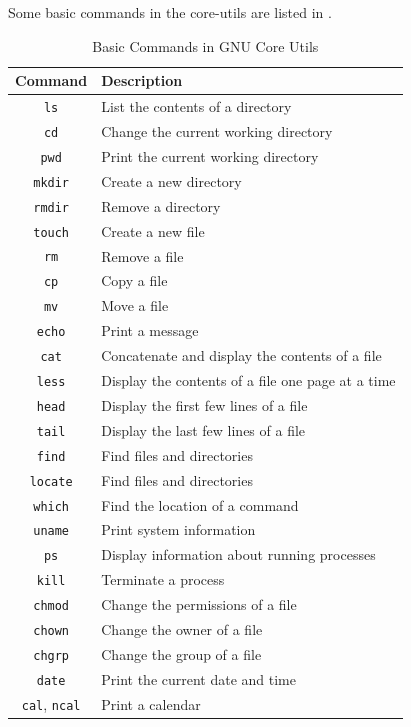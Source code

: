 Some basic commands in the core-utils are listed in .

\begin{table}[h!]
\caption{Basic Commands in GNU Core Utils}
\begin{tabular}{ c l }
  \toprule
 Command & Description \\
 \midrule
  \texttt{ls} & List the contents of a directory \\
  \texttt{cd} & Change the current working directory \\
  \texttt{pwd} & Print the current working directory \\
  \texttt{mkdir} & Create a new directory \\
  \texttt{rmdir} & Remove a directory \\
  \texttt{touch} & Create a new file \\
  \texttt{rm} & Remove a file \\
  \texttt{cp} & Copy a file \\
  \texttt{mv} & Move a file \\
  \texttt{echo} & Print a message \\
  \texttt{cat} & Concatenate and display the contents of a file \\
  \texttt{less} & Display the contents of a file one page at a time \\
  \texttt{head} & Display the first few lines of a file \\
  \texttt{tail} & Display the last few lines of a file \\
  \texttt{find} & Find files and directories \\
  \texttt{locate} & Find files and directories \\
  \texttt{which} & Find the location of a command \\
  \texttt{uname} & Print system information \\
  \texttt{ps} & Display information about running processes \\
  \texttt{kill} & Terminate a process \\
  \texttt{chmod} & Change the permissions of a file \\
  \texttt{chown} & Change the owner of a file \\
  \texttt{chgrp} & Change the group of a file \\
  \texttt{date} & Print the current date and time \\
  \texttt{cal}, \texttt{ncal} & Print a calendar \\

\end{tabular}
\end{table}
